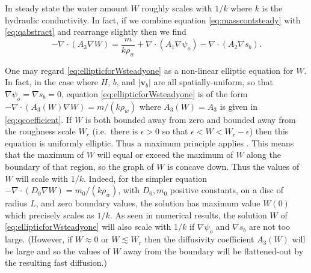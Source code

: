 \documentclass[gmd]{copernicus}   %
\newcommand\bv{\mathbf{v}}
\newcommand{\Div}{\nabla\cdot}
\newcommand\eps{\epsilon}
\newcommand{\grad}{\nabla}
\begin{document}
In steady state the water amount $W$ roughly scales with $1/k$ where $k$ is the hydraulic conductivity.  In fact, if we combine equation \eqref{eq:masscontsteady} with \eqref{eq:qabstract} and rearrange slightly then we find
\begin{equation}
-\Div \left(A_3 \grad W\right) = \frac{m}{k \rho_w} + \Div \left(A_1 \grad \psi_o\right) - \Div \left(A_2 \grad s_b\right).  \label{eq:ellipticforWsteadyone}
\end{equation}

One may regard \eqref{eq:ellipticforWsteadyone} as a non-linear elliptic equation for $W$.  In fact, in the case where $H$, $b$, and $|\bv_b|$ are all spatially-uniform, so that $\grad \psi_o = \grad s_b = 0$, equation \eqref{eq:ellipticforWsteadyone} is of the form $-\Div \left(A_3(W) \grad W\right) = m/(k \rho_w)$ where $A_3(W) = A_3$ is given in \eqref{eq:qcoefficient}.  If $W$ is both bounded away from zero and bounded away from the roughness scale $W_r$ (i.e.~there is $\eps>0$ so that $\eps < W < W_r-\eps$) then this equation is uniformly elliptic.  Thus a maximum principle applies \citep{Evans}.  This means that the maximum of $W$ will equal or exceed the maximum of $W$ along the boundary of that region, so the graph of $W$ is concave down.  Thus the values of $W$ will scale with $1/k$.  Indeed, for the simpler equation $-\Div \left(D_0 \grad W\right) = m_0/(k \rho_w)$, with $D_0,m_0$ positive constants, on a disc of radius $L$, and zero boundary values, the solution has maximum value $W(0)$ which precisely scales as $1/k$.  As seen in numerical results, the solution $W$ of \eqref{eq:ellipticforWsteadyone} will also scale with $1/k$ if $\grad \psi_o$ and $\grad s_b$ are not too large.  (However, if $W\approx 0$  or $W\lesssim W_r$ then the diffusivity coefficient $A_3(W)$ will be large and so the values of $W$ away from the boundary will be flattened-out by the resulting fast diffusion.)
\end{document}

